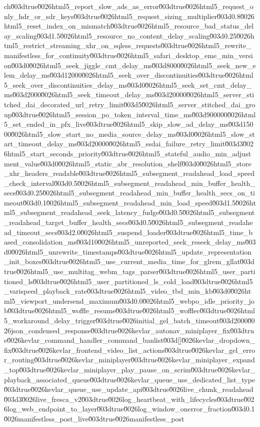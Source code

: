 {ch\u003dtrue\u0026html5_report_slow_ads_as_error\u003dtrue\u0026html5_request_only_hdr_or_sdr_keys\u003dtrue\u0026html5_request_sizing_multiplier\u003d0.8\u0026html5_reset_index_on_mismatch\u003dtrue\u0026html5_resource_bad_status_delay_scaling\u003d1.5\u0026html5_resource_no_content_delay_scaling\u003d0.25\u0026html5_restrict_streaming_xhr_on_sqless_requests\u003dtrue\u0026html5_rewrite_manifestless_for_continuity\u003dtrue\u0026html5_safari_desktop_eme_min_version\u003d0\u0026html5_seek_jiggle_cmt_delay_ms\u003d8000\u0026html5_seek_new_elem_delay_ms\u003d12000\u0026html5_seek_over_discontinuities\u003dtrue\u0026html5_seek_over_discontinuities_delay_ms\u003d0\u0026html5_seek_set_cmt_delay_ms\u003d2000\u0026html5_seek_timeout_delay_ms\u003d20000\u0026html5_server_stitched_dai_decorated_url_retry_limit\u003d5\u0026html5_server_stitched_dai_group\u003dtrue\u0026html5_session_po_token_interval_time_ms\u003d900000\u0026html5_set_ended_in_pfx_live\u003dtrue\u0026html5_skip_slow_ad_delay_ms\u003d15000\u0026html5_slow_start_no_media_source_delay_ms\u003d0\u0026html5_slow_start_timeout_delay_ms\u003d20000\u0026html5_ssdai_failure_retry_limit\u003d3\u0026html5_start_seconds_priority\u003dtrue\u0026html5_stateful_audio_min_adjustment_value\u003d0\u0026html5_static_abr_resolution_shelf\u003d0\u0026html5_store_xhr_headers_readable\u003dtrue\u0026html5_subsegment_readahead_load_speed_check_interval\u003d0.5\u0026html5_subsegment_readahead_min_buffer_health_secs\u003d0.25\u0026html5_subsegment_readahead_min_buffer_health_secs_on_timeout\u003d0.1\u0026html5_subsegment_readahead_min_load_speed\u003d1.5\u0026html5_subsegment_readahead_seek_latency_fudge\u003d0.5\u0026html5_subsegment_readahead_target_buffer_health_secs\u003d0.5\u0026html5_subsegment_readahead_timeout_secs\u003d2.0\u0026html5_suspend_loader\u003dtrue\u0026html5_time_based_consolidation_ms\u003d10\u0026html5_unreported_seek_reseek_delay_ms\u003d0\u0026html5_unrewrite_timestamps\u003dtrue\u0026html5_update_representation_init_boxes\u003dtrue\u0026html5_use_current_media_time_for_glrem_gllat\u003dtrue\u0026html5_use_multitag_webm_tags_parser\u003dtrue\u0026html5_user_partitioned_ls\u003dtrue\u0026html5_user_partitioned_ls_cold_load\u003dtrue\u0026html5_varispeed_playback_rate\u003dtrue\u0026html5_video_tbd_min_kb\u003d0\u0026html5_viewport_undersend_maximum\u003d0.0\u0026html5_webpo_idle_priority_job\u003dtrue\u0026html5_woffle_resume\u003dtrue\u0026html5_wofflec\u003dtrue\u0026html5_workaround_delay_trigger\u003dtrue\u0026initial_gel_batch_timeout\u003d2000\u0026json_condensed_response\u003dtrue\u0026kevlar_autonav_miniplayer_fix\u003dtrue\u0026kevlar_command_handler_command_banlist\u003d[]\u0026kevlar_dropdown_fix\u003dtrue\u0026kevlar_frontend_video_list_actions\u003dtrue\u0026kevlar_gel_error_routing\u003dtrue\u0026kevlar_miniplayer\u003dtrue\u0026kevlar_miniplayer_expand_top\u003dtrue\u0026kevlar_miniplayer_play_pause_on_scrim\u003dtrue\u0026kevlar_playback_associated_queue\u003dtrue\u0026kevlar_queue_use_dedicated_list_type\u003dtrue\u0026kevlar_queue_use_update_api\u003dtrue\u0026live_chunk_readahead\u003d3\u0026live_fresca_v2\u003dtrue\u0026log_heartbeat_with_lifecycles\u003dtrue\u0026log_web_endpoint_to_layer\u003dtrue\u0026log_window_onerror_fraction\u003d0.1\u0026manifestless_post_live\u003dtrue\u0026manifestless_post}
